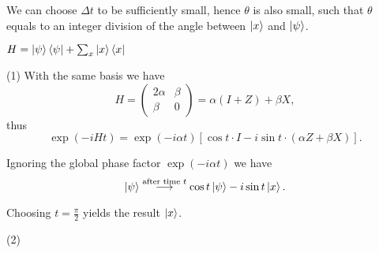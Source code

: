 \ex We can choose $\Delta t$ to be sufficiently small, hence $\theta$ is also small, such that $\theta$ equals to an integer division of the angle between $\left|x\right\rangle$ and $\left|\psi\right\rangle$.

\ex $H=\left|\psi\right\rangle\left\langle\psi\right| + \sum_x\left|x\right\rangle\left\langle x\right|$ \redstar

\ex (1) With the same basis we have
$$H = \begin{pmatrix}
    2\alpha & \beta \\
    \beta & 0
\end{pmatrix} = \alpha(I+Z) + \beta X,$$
thus
$$\exp(-iHt) = \exp(-i\alpha t)[\cos t\cdot I-i\sin t\cdot(\alpha Z+\beta X)].$$

Ignoring the global phase factor $\exp(-i\alpha t)$ we have
$$\left|\psi\right\rangle \overset{\text{after time }t}{\longrightarrow} \cos t\left|\psi\right\rangle - i\sin t\left|x\right\rangle.$$

Choosing $t=\frac{\pi}{2}$ yields the result $\left|x\right\rangle$.

(2) 

